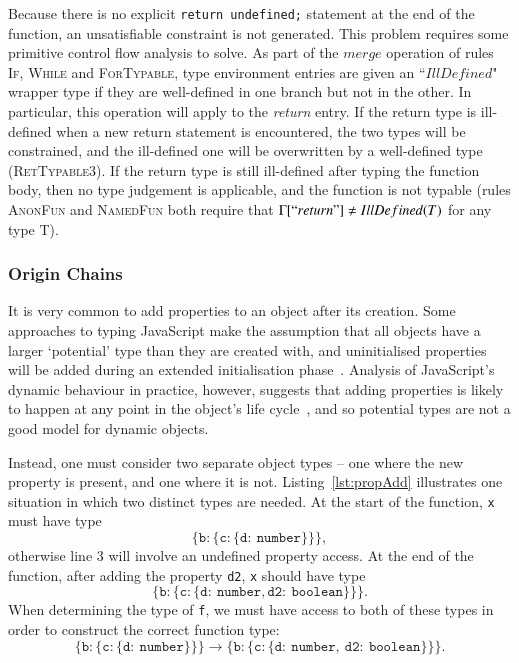 \documentclass[12pt,a4paper,twoside,openright]{report}
\newcommand*{\js}{\texttt}
\begin{document}
Because there is no explicit \js{return undefined;} statement at the end of the
function, an unsatisfiable constraint is not generated. This problem requires
some primitive control flow analysis to solve. As part of the $merge$ operation
of rules \textsc{If}, \textsc{While} and \textsc{ForTypable}, type environment
entries are given an ``$IllDefined$" wrapper type if they are well-defined in
one branch but not in the other. In particular, this operation will apply to
the \textit{return} entry. If the return type is ill-defined when a new return
statement is encountered, the two types will be constrained, and the
ill-defined one will be overwritten by a well-defined type
(\textsc{RetTypable3}).  If the return type is still ill-defined after typing
the function body, then no type judgement is applicable, and the function is
not typable (rules \textsc{AnonFun} and \textsc{NamedFun} both require that
$\Gamma[``return"]\neq IllDefined(T)$ for any type T).

\subsubsection*{Origin Chains}
It is very common to add properties to an object
after its creation. Some approaches to typing JavaScript make the assumption
that all objects have a larger `potential' type than they are created with, and
uninitialised properties will be added during an extended initialisation
phase~\cite{anderson05}. Analysis of JavaScript's dynamic behaviour in
practice, however, suggests that adding properties is likely to happen at any
point in the object's life cycle~\cite{JSBehaviour}, and so potential types are
not a good model for dynamic objects.

Instead, one must consider two separate object types -- one where the new
property is present, and one where it is not. Listing~\ref{lst:propAdd}
illustrates one situation in which two distinct types are needed. At the start
of the function, \js{x} must have type $$\mathtt{\{b:\{c:\{d:\ number\}\}\}},$$
otherwise line 3 will involve an undefined property access. At the end of the
function, after adding the property \js{d2}, \js{x} should have type $$\mathtt{\{b:\{c:\{d:\ number, d2:\
  boolean\}\}\}}.$$ When determining the type
of \js{f}, we must have access to both of these types in order to construct the
correct function type: $$\mathtt{\{b:\{c:\{d:\ number\}\}\} \rightarrow
  \{b:\{c:\{d:\ number,\ d2:\ boolean\}\}\}}.$$
\end{document}
